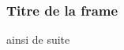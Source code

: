 \documentclass[9pt]{beamer}
\begin{document}

\begin{frame}

	\frametitle{ Titre de la frame }

	ainsi de suite

\end{frame}

\end{document}
